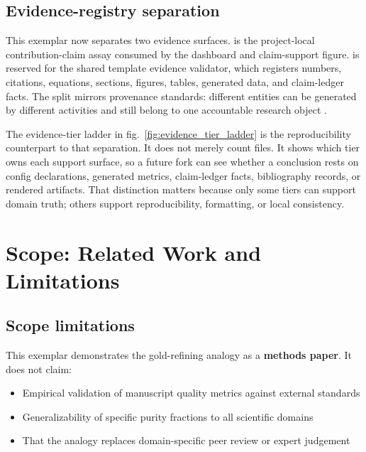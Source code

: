 \documentclass[
]{article}
\providecommand{\tightlist}{%
  \setlength{\itemsep}{0pt}\setlength{\parskip}{0pt}}
\begin{document}
\subsection{Evidence-registry
separation}\label{evidence-registry-separation}

This exemplar now separates two evidence surfaces.
 is the
project-local contribution-claim assay consumed by the dashboard and
claim-support figure.  is
reserved for the shared template evidence validator, which registers
numbers, citations, equations, sections, figures, tables, generated
data, and claim-ledger facts. The split mirrors provenance standards:
different entities can be generated by different activities and still
belong to one accountable research object
\citep{moreau2013prov, belhajjame2015ontologies}.

The evidence-tier ladder in fig.~\ref{fig:evidence_tier_ladder} is the
reproducibility counterpart to that separation. It does not merely count
files. It shows which tier owns each support surface, so a future fork
can see whether a conclusion rests on config declarations, generated
metrics, claim-ledger facts, bibliography records, or rendered
artifacts. That distinction matters because only some tiers can support
domain truth; others support reproducibility, formatting, or local
consistency.

\newpage

\section{Scope: Related Work and Limitations}\label{sec:scope}

\subsection{Scope limitations}\label{scope-limitations}

This exemplar demonstrates the gold-refining analogy as a
\textbf{methods paper}. It does not claim:

\begin{itemize}
\tightlist
\item
  Empirical validation of manuscript quality metrics against external
  standards
\item
  Generalizability of specific purity fractions to all scientific
  domains
\item
  That the analogy replaces domain-specific peer review or expert
  judgement
\end{itemize}
\end{document}

